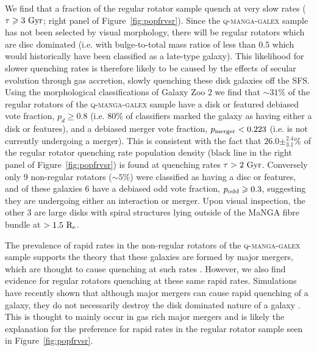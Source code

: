 \documentclass[useAMS,usenatbib]{mn2e}
\begin{document}

We find that a fraction of the regular rotator sample quench at very slow rates ($\tau \geq 3~\rm{Gyr}$; right panel of Figure~\ref{fig:popfrvsr}). Since the \textsc{q-manga-galex} sample has not been selected by visual morphology, there will be regular rotators which are disc dominated (i.e. with bulge-to-total mass ratios of less than $0.5$ which would historically have been classified as a late-type galaxy). This likelihood for slower quenching rates is therefore likely to be caused by the effects of secular evolution through gas accretion, slowly quenching these disk galaxies off the SFS. Using the morphological classifications of Galaxy Zoo 2 \citep{lintott11, GZ2} we find that $\sim 31\%$ of the regular rotators of the \textsc{q-manga-galex} sample have a disk or featured debiased vote fraction, $p_d \geq 0.8$ (i.e. $80\%$ of classifiers marked the galaxy as having either a disk or features), and a debiased merger vote fraction, $p_{\rm{merger}} < 0.223$ (i.e. is not currently undergoing a merger). This is consistent with the fact that $26.0\pm^{2.4}_{3.1}\%$ of the regular rotator quenching rate population density (black line in the right panel of Figure~\ref{fig:popfrvsr}) is found at quenching rates $\tau > 2~\rm{Gyr}$. Conversely only 9 non-regular rotators ($\sim5\%$) were classified as having a disc or features, and of these galaxies $6$ have a debiased odd vote fraction, $p_{\rm{odd}} \geq 0.3$, suggesting they are undergoing either an interaction or merger. Upon visual inspection, the other 3 are large disks with spiral structures lying outside of the MaNGA fibre bundle at $>1.5~\rm{R_e}$.

The prevalence of rapid rates in the non-regular rotators of the \textsc{q-manga-galex} sample supports the theory that these galaxies are formed by major mergers, which are thought to cause quenching at such rates \citep{springel05b, bell06, lotz08b,lotz11,smethurst15}. However, we also find evidence for regular rotators quenching at these same rapid rates. Simulations have recently shown that although major mergers can cause rapid quenching of a galaxy, they do not necessarily destroy the disk dominated nature of a galaxy \citep{pontzen16, sparre16}. This is thought to mainly occur in gas rich major mergers and is likely the explanation for the preference for rapid rates in the regular rotator sample seen in Figure~\ref{fig:popfrvsr}.
\end{document}
